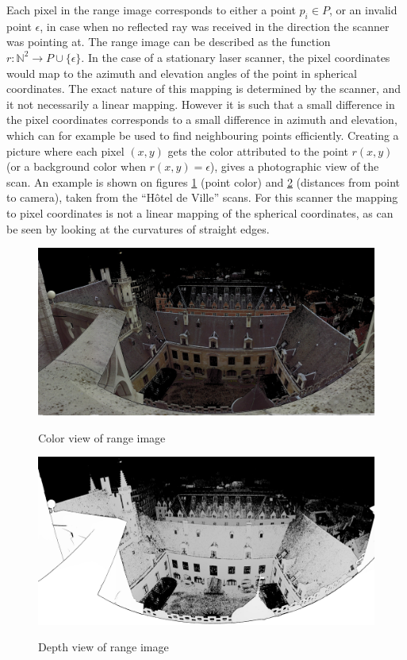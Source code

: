 Each pixel in the range image corresponds to either a point $p_i \in P$, or an invalid point $\epsilon$, in case when no reflected ray was received in the direction the scanner was pointing at. The range image can be described as the function $r : \mathbb{N}^2 \rightarrow P \cup \{ \epsilon \}$. In the case of a stationary laser scanner, the pixel coordinates would map to the azimuth and elevation angles of the point in spherical coordinates. The exact nature of this mapping is determined by the scanner, and it not necessarily a linear mapping. However it is such that a small difference in the pixel coordinates corresponds to a small difference in azimuth and elevation, which can for example be used to find neighbouring points efficiently. Creating a picture where each pixel $(x, y)$ gets the color attributed to the point $r(x, y)$ (or a background color when $r(x, y) = \epsilon$), gives a photographic view of the scan. An example is shown on figures \ref{fig:hdv_033_color} (point color) and \ref{fig:hdv_033_range} (distances from point to camera), taken from the ``Hôtel de Ville'' scans. For this scanner the mapping to pixel coordinates is not a linear mapping of the spherical coordinates, as can be seen by looking at the curvatures of straight edges.

\begin{figure}[p]
\center
\includegraphics[width=.8\textwidth]{fig/hdv_033_color.jpg}
\label{fig:hdv_033_color}
\caption{Color view of range image}
\end{figure}

\begin{figure}[p]
\center
\includegraphics[width=.8\textwidth]{fig/hdv_033_range.jpg}
\label{fig:hdv_033_range}
\caption{Depth view of range image}
\end{figure}

